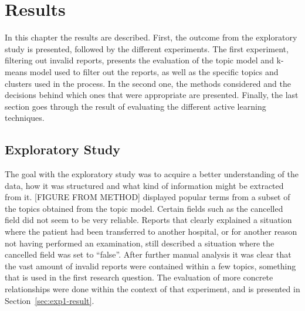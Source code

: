 \chapter{Results}
\label{cha:results}




In this chapter the results are described.
First, the outcome from the exploratory study is presented, followed by the different experiments.
The first experiment, filtering out invalid reports, presents the evaluation of the topic model and k-means model used to filter out the reports, as well as the specific topics and clusters used in the process.
In the second one, the methods considered and the decisions behind which ones that were appropriate are presented.
Finally, the last section goes through the result of evaluating the different active learning techniques.

\section{Exploratory Study}

The goal with the exploratory study was to acquire a better understanding of the data, how it was structured and what kind of information might be extracted from it.
[FIGURE FROM METHOD] displayed popular terms from a subset of the topics obtained from the topic model.
Certain fields such as the cancelled field did not seem to be very reliable. 
Reports that clearly explained a situation where the patient had been transferred to another hospital, or for another reason not having performed an examination, still described a situation where the cancelled field was set to ``false''.
After further manual analysis it was clear that the vast amount of invalid reports were contained within a few topics, something that is used in the first research question.
The evaluation of more concrete relationships were done within the context of that experiment, and is presented in Section~\ref{sec:exp1-result}.

